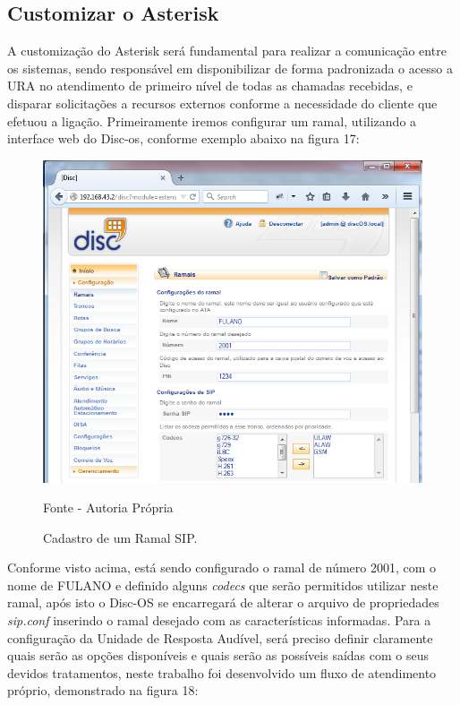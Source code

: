 \subsection{Customizar o Asterisk}

A customização do Asterisk será fundamental para realizar a comunicação entre os sistemas, sendo responsável em disponibilizar de forma padronizada o acesso a URA no atendimento de primeiro nível de todas as chamadas recebidas, e disparar solicitações a recursos externos conforme a necessidade do cliente que efetuou a ligação.
Primeiramente iremos configurar um ramal, utilizando a interface web do Disc-os, conforme exemplo abaixo na figura 17:


\begin{figure}[!htb]
	\centering
	\includegraphics{figuras/cadastro_ramal_sip.png}
	\caption{Cadastro de um Ramal SIP.}	
	Fonte - Autoria Própria
\end{figure}


Conforme visto acima, está sendo configurado o ramal de número 2001, com o nome de FULANO e definido alguns \textit{codecs} que serão permitidos utilizar neste ramal, após isto o Disc-OS se encarregará de alterar o arquivo de propriedades \textit{sip.conf} inserindo o ramal desejado com as características informadas.
Para a configuração da Unidade de Resposta Audível, será preciso definir claramente quais serão as opções disponíveis e quais serão as possíveis saídas com o seus devidos tratamentos, neste trabalho foi desenvolvido um fluxo de atendimento próprio, demonstrado na figura 18: 

